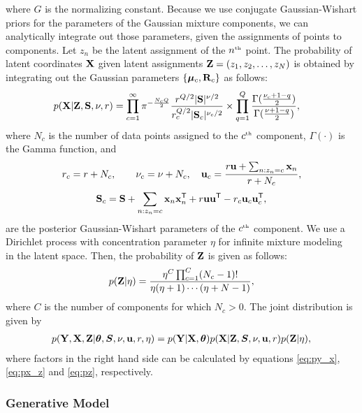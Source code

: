 where $G$ is the normalizing constant.
Because we use conjugate Gaussian-Wishart priors for the parameters of the Gaussian mixture components, we can analytically integrate out those parameters, given the assignments of points to components.
Let $z_{n}$ be the latent assignment of the $n^{\text{\tiny th}}$ point.
The probability of latent coordinates $\mathbf{X}$ given latent assignments $\mathbf{Z}=(z_1, z_2, \dots, z_N)$ is obtained by integrating out the Gaussian parameters $\{{\boldsymbol{\mu}}_c,\mathbf{R}_c\}$ as follows:
%
\begin{align}
p(\mathbf{X}|\mathbf{Z},\mathbf{S},\nu,r) &= \prod_{c=1}^{\infty}
\pi^{-\frac{N_{c}Q}{2}}\frac{r^{Q/2}|\mathbf{S}|^{\nu/2}}{r_{c}^{Q/2}|\mathbf{S}_{c}|^{\nu_{c}/2}}
\times \prod_{q=1}^{Q}\frac{\Gamma(\frac{\nu_{c}+1-q}{2})}{\Gamma(\frac{\nu+1-q}{2})},
\label{eq:px_z}
\end{align}
%
where
$N_c$ is the number of data points assigned to the $c^{\text{\tiny th}}$ component,
$\Gamma(\cdot)$ is the Gamma function, and
%
\begin{align}
r_{c}=r+N_{c}, \hspace{2em}
\nu_{c}=\nu+N_{c}, 
\quad
{\bf{u}}_{c}=\frac{r{\bf{u}}+\sum_{n:z_{n}=c}{\bf{x}}_{n}}{r+N_{c}}, 
\nonumber
\end{align}
%
\begin{align}
\mathbf{S}_{c}=\mathbf{S}+\sum_{n:z_{n}=c}{\bf{x}}_{n}{\bf{x}}_{n}^{\mathsf{T}} + r{\bf{u}}{\bf{u}}^{\mathsf{T}}
 - r_{c}{\bf{u}}_{c}{\bf{u}}_{c}^{\mathsf{T}},
\end{align}
%
are the posterior Gaussian-Wishart parameters of the $c^{\text{\tiny th}}$ component.
We use a Dirichlet process with concentration parameter $\eta$ for infinite mixture modeling~\citep{maceachern1998estimating} in the latent space.
Then, the probability of $\mathbf{Z}$ is given as follows:
%
\begin{align}
p(\mathbf{Z}|\eta) = 
\frac{\eta^{C}\prod_{c=1}^{C}(N_{c}-1)!}
{\eta(\eta+1)\cdots(\eta+N-1)},
\label{eq:pz}
\end{align}
%
where $C$ is the number of components for which $N_{c}>0$.
The joint distribution is given by
%
\begin{align}
p(\mathbf{Y},\mathbf{X},\mathbf{Z}|\bm{\theta},\bm{S},\nu,{\bf{u}},r,\eta)
 = p(\mathbf{Y}|\mathbf{X},\bm{\theta})
 p(\mathbf{X}|\mathbf{Z},\bm{S},\nu,{\bf{u}},r)p(\mathbf{Z}|\eta),
\label{eq:joint}
\end{align}
%
where factors in the right hand side can be calculated by equations \eqref{eq:py_x}, \eqref{eq:px_z} and \eqref{eq:pz}, respectively.

\subsubsection{Generative Model}

